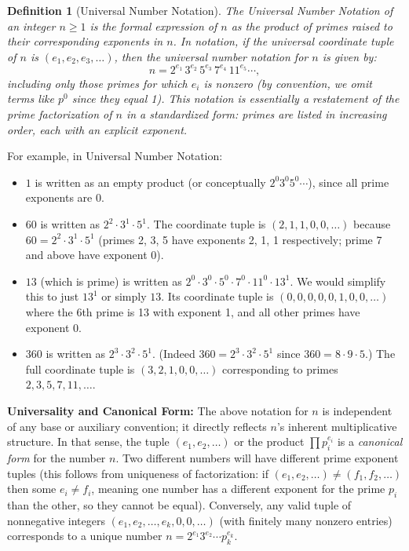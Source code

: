 \documentclass[11pt]{article}
\newtheorem{definition}{Definition}
\begin{document}
\begin{definition}[Universal Number Notation]\label{def:notation}
The \emph{Universal Number Notation} of an integer $n \ge 1$ is the formal expression of $n$ as the product of primes raised to their corresponding exponents in $n$. In notation, if the universal coordinate tuple of $n$ is $(e_1, e_2, e_3, \dots)$, then the universal number notation for $n$ is given by:
\[ n = 2^{e_1} \, 3^{e_2} \, 5^{e_3} \, 7^{e_4} \, 11^{e_5} \cdots, \]
including only those primes for which $e_i$ is nonzero (by convention, we omit terms like $p^0$ since they equal 1). This notation is essentially a restatement of the prime factorization of $n$ in a standardized form: primes are listed in increasing order, each with an explicit exponent.
\end{definition}

For example, in Universal Number Notation:
\begin{itemize}
  \item $1$ is written as an empty product (or conceptually $2^0 3^0 5^0\cdots$), since all prime exponents are 0.
  \item $60$ is written as $2^2 \cdot 3^1 \cdot 5^1$. The coordinate tuple is $(2,1,1,0,0,\dots)$ because $60 = 2^2 \cdot 3^1 \cdot 5^1$ (primes 2, 3, 5 have exponents 2, 1, 1 respectively; prime 7 and above have exponent 0).
  \item $13$ (which is prime) is written as $2^0 \cdot 3^0 \cdot 5^0 \cdot 7^0 \cdot 11^0 \cdot 13^1$. We would simplify this to just $13^1$ or simply $13$. Its coordinate tuple is $(0,0,0,0,0,1,0,0,\dots)$ where the 6th prime is 13 with exponent 1, and all other primes have exponent 0.
  \item $360$ is written as $2^3 \cdot 3^2 \cdot 5^1$. (Indeed $360 = 2^3 \cdot 3^2 \cdot 5^1$ since $360 = 8 \cdot 9 \cdot 5$.) The full coordinate tuple is $(3,2,1,0,0,\dots)$ corresponding to primes $2,3,5,7,11,\dots$.
\end{itemize}

\noindent \textbf{Universality and Canonical Form:} The above notation for $n$ is independent of any base or auxiliary convention; it directly reflects $n$'s inherent multiplicative structure. In that sense, the tuple $(e_1, e_2, \ldots)$ or the product $\prod p_i^{e_i}$ is a \emph{canonical form} for the number $n$. Two different numbers will have different prime exponent tuples (this follows from uniqueness of factorization: if $(e_1,e_2,\dots) \neq (f_1,f_2,\dots)$ then some $e_i \neq f_i$, meaning one number has a different exponent for the prime $p_i$ than the other, so they cannot be equal). Conversely, any valid tuple of nonnegative integers $(e_1, e_2, \ldots, e_k, 0,0,\ldots)$ (with finitely many nonzero entries) corresponds to a unique number $n = 2^{e_1} 3^{e_2} \cdots p_k^{e_k}$. 
\end{document}
